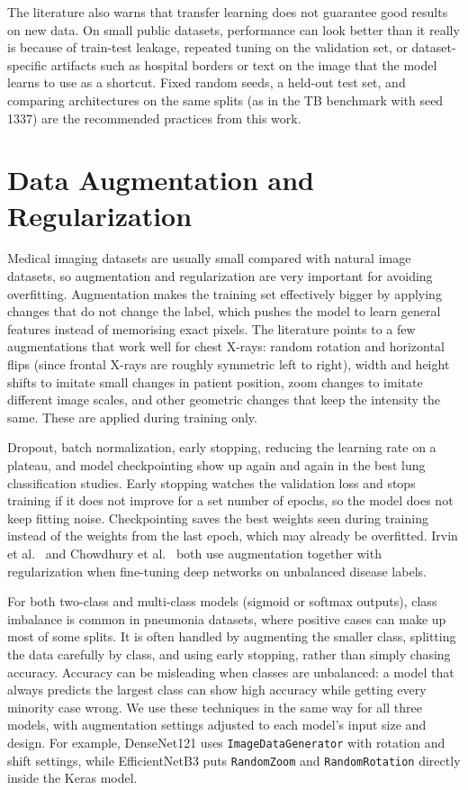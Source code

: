The literature also warns that transfer learning does not guarantee good results on new data. On small public datasets, performance can look better than it really is because of train-test leakage, repeated tuning on the validation set, or dataset-specific artifacts such as hospital borders or text on the image that the model learns to use as a shortcut. Fixed random seeds, a held-out test set, and comparing architectures on the same splits (as in the TB benchmark with seed 1337) are the recommended practices from this work.

\section{Data Augmentation and Regularization}

Medical imaging datasets are usually small compared with natural image datasets, so augmentation and regularization are very important for avoiding overfitting. Augmentation makes the training set effectively bigger by applying changes that do not change the label, which pushes the model to learn general features instead of memorising exact pixels. The literature points to a few augmentations that work well for chest X-rays: random rotation and horizontal flips (since frontal X-rays are roughly symmetric left to right), width and height shifts to imitate small changes in patient position, zoom changes to imitate different image scales, and other geometric changes that keep the intensity the same. These are applied during training only.

Dropout, batch normalization, early stopping, reducing the learning rate on a plateau, and model checkpointing show up again and again in the best lung classification studies. Early stopping watches the validation loss and stops training if it does not improve for a set number of epochs, so the model does not keep fitting noise. Checkpointing saves the best weights seen during training instead of the weights from the last epoch, which may already be overfitted. Irvin et al.~\cite{irvin2019} and Chowdhury et al.~\cite{chowdhury2020} both use augmentation together with regularization when fine-tuning deep networks on unbalanced disease labels.

For both two-class and multi-class models (sigmoid or softmax outputs), class imbalance is common in pneumonia datasets, where positive cases can make up most of some splits. It is often handled by augmenting the smaller class, splitting the data carefully by class, and using early stopping, rather than simply chasing accuracy. Accuracy can be misleading when classes are unbalanced: a model that always predicts the largest class can show high accuracy while getting every minority case wrong. We use these techniques in the same way for all three models, with augmentation settings adjusted to each model's input size and design. For example, DenseNet121 uses \texttt{ImageDataGenerator} with rotation and shift settings, while EfficientNetB3 puts \texttt{RandomZoom} and \texttt{RandomRotation} directly inside the Keras model.

